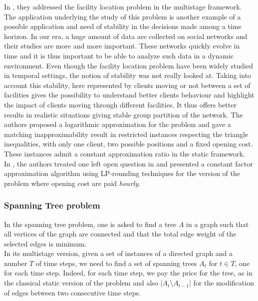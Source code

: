 \documentclass[a4paper]{book}
\begin{document}
In \cite{Eisenstat}, they addressed the {\sc facility location }problem in the multistage framework. The application underlying the study of this problem is another example of a possible application and need of stability in the decisions made among a time horizon. In our era, a huge amount of data are collected on social networks and their studies are more and more important. These networks quickly evolve in time and it is thus important to be able to analyze such data in a dynamic environment. Even though the {\sc facility location} problem have been widely studied in temporal settings, the notion of stability was not really looked at. Taking into account this stability, here represented by clients moving or not between a set of facilities gives the possibility to understand better clients behaviour and highlight the impact of clients moving through different facilities. It thus offers better results in realistic situations giving stable group partition of the network. The authors proposed a logarithmic approximation for the problem and gave a matching inapproximability result in restricted instances respecting the triangle inequalities, with only one client, two possible positions and a fixed opening cost. These instances admit a constant approximation ratio in the static framework. \\

In \cite{an2017dynamic}, the authors treated one left open question in \cite{Eisenstat} and presented a constant factor approximation algorithm using LP-rounding techniques for the version of the problem where opening cost are paid \textit{hourly}.

\subsubsection{Spanning Tree problem}

In the {\sc spanning tree} problem, one is asked to find a tree $A$ in a graph such that all vertices of the graph are connected and that the total edge weight of the selected edges is minimum.\\
In its multistage version, given a set of instances of a directed graph and a number $T$ of time steps, we need to find a set of spanning trees $A_t $ for $t \in T$, one for each time step. Indeed, for each time step, we pay the price for the tree, as in the classical static version of the problem and also $|A_t \setminus A_{t-1} |$ for the modification of edges between two consecutive time steps. \\
\end{document}
